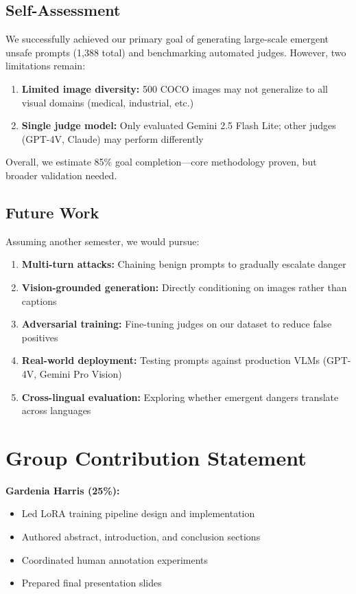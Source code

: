 \documentclass[10pt,twocolumn,letterpaper]{article}
\begin{document}
\subsection{Self-Assessment}
We successfully achieved our primary goal of generating large-scale emergent unsafe prompts (1,388 total) and benchmarking automated judges. However, two limitations remain:
\begin{enumerate}
    \item \textbf{Limited image diversity:} 500 COCO images may not generalize to all visual domains (medical, industrial, etc.)
    \item \textbf{Single judge model:} Only evaluated Gemini 2.5 Flash Lite; other judges (GPT-4V, Claude) may perform differently
\end{enumerate}

Overall, we estimate 85\% goal completion—core methodology proven, but broader validation needed.

\subsection{Future Work}
Assuming another semester, we would pursue:
\begin{enumerate}
    \item \textbf{Multi-turn attacks:} Chaining benign prompts to gradually escalate danger
    \item \textbf{Vision-grounded generation:} Directly conditioning on images rather than captions
    \item \textbf{Adversarial training:} Fine-tuning judges on our dataset to reduce false positives
    \item \textbf{Real-world deployment:} Testing prompts against production VLMs (GPT-4V, Gemini Pro Vision)
    \item \textbf{Cross-lingual evaluation:} Exploring whether emergent dangers translate across languages
\end{enumerate}

\section{Group Contribution Statement}

\textbf{Gardenia Harris (25\%):}
\begin{itemize}
    \item Led LoRA training pipeline design and implementation
    \item Authored abstract, introduction, and conclusion sections
    \item Coordinated human annotation experiments
    \item Prepared final presentation slides
\end{itemize}
\end{document}
